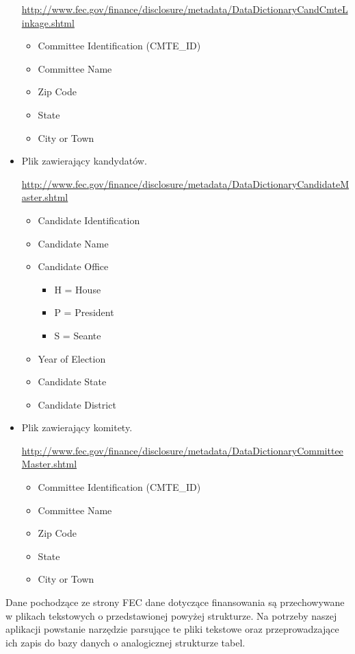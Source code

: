 \documentclass[10pt,a4paper]{article}
\begin{document}
\begin{itemize}
\url{http://www.fec.gov/finance/disclosure/metadata/DataDictionaryCandCmteLinkage.shtml}

\begin{itemize}
\item Committee Identification (CMTE\_ID)
\item Committee Name
\item Zip Code
\item State
\item City or Town
\end{itemize}


\item Plik zawierający kandydatów.

\url{http://www.fec.gov/finance/disclosure/metadata/DataDictionaryCandidateMaster.shtml}

\begin{itemize}
\item Candidate Identification
\item Candidate Name
\item Candidate Office
\begin{itemize}
\item H = House
\item P = President
\item S = Seante
\end{itemize}
\item Year of Election
\item Candidate State
\item Candidate District
\end{itemize}


\item Plik zawierający komitety.

\url{http://www.fec.gov/finance/disclosure/metadata/DataDictionaryCommitteeMaster.shtml}

\begin{itemize}
\item Committee Identification (CMTE\_ID)
\item Committee Name
\item Zip Code
\item State
\item City or Town
\end{itemize}
\end{itemize}


Dane pochodzące ze strony FEC dane dotyczące finansowania są przechowywane w plikach tekstowych o przedstawionej powyżej strukturze. Na potrzeby naszej aplikacji powstanie narzędzie parsujące te pliki tekstowe oraz przeprowadzające ich zapis do bazy danych o analogicznej strukturze tabel. 
\end{document}
